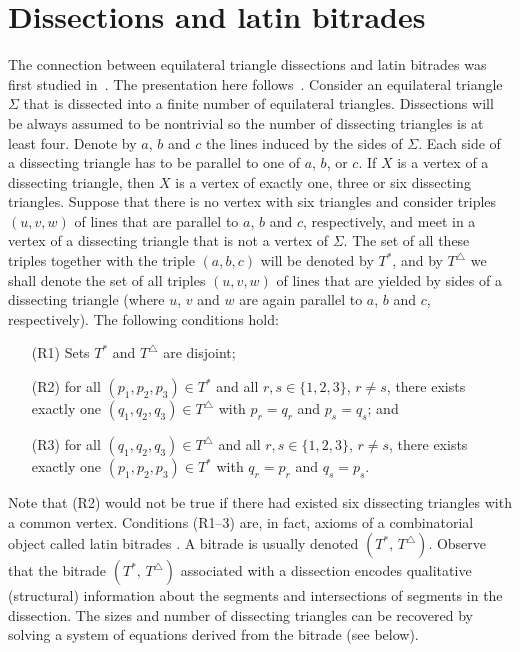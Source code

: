 \documentclass[12pt,amstags,fleqn]{article}
\theoremstyle{plain}
\theoremstyle{definition}
\def\ll{{\textstyle \ast}}
\def\rr{{\scriptscriptstyle \triangle}}
\newcommand{\opa}{\ll}
\newcommand{\opb}{\rr}
\begin{document}
\section{Dissections and latin bitrades}

The connection between equilateral triangle dissections and latin
bitrades was first studied in~\cite{aleshamming}. The presentation here
follows~\cite{alesdissections}.  
Consider an equilateral triangle $\Sigma$ that is dissected
into a finite number of equilateral triangles. 
Dissections will be always assumed to be nontrivial so the
number of dissecting triangles is at least four. 
Denote by $a$, $b$ and $c$
the lines induced by the sides of $\Sigma$.
Each side of a dissecting triangle has to be parallel
to one of $a$, $b$, or $c$. If $X$ is a vertex
of a dissecting triangle, then $X$ is a vertex of exactly one,
three or six dissecting triangles. Suppose that there is
no vertex with six triangles and consider triples 
$(u,v,w)$ of lines that are parallel to $a$, $b$ and $c$, respectively,
and meet in  a vertex of a dissecting triangle that is not a vertex
of $\Sigma$. The set of all these triples together with the triple
$(a,b,c)$ will be denoted by $T^\ll$, and by $T^\rr$ we shall
denote the set of all triples $(u,v,w)$ of lines that are yielded 
by sides of a dissecting triangle (where $u$, $v$ and $w$ are again parallel to
$a$, $b$ and $c$, respectively). The following conditions
hold:
\begin{enumerate}
\item[(R1)] Sets $T^\ll$ and $T^\rr$ are disjoint;
\item[(R2)] for all $(p_1,p_2,p_3)\in T^\ll$ and 
all $r,s \in \{1,2,3\}$, $r \ne s$, there exists exactly one
$(q_1,q_2,q_3) \in T^\rr$ with $p_r = q_r$ and $p_s = q_s$; and
\item[(R3)] for all $(q_1,q_2,q_3)\in T^\rr$ and
all $r,s \in \{1,2,3\}$, $r \ne s$, there exists exactly one
$(p_1,p_2,p_3) \in T^\ll$ with $q_r = p_r$ and $q_s = p_s$.
\end{enumerate}

Note that (R2) would not be true if there had existed six dissecting
triangles with a common vertex. Conditions (R1--3) are, in fact, axioms
of a combinatorial object called latin bitrades
\cite[p.~148]{wanlesshandbook}. A bitrade is usually denoted
$(T^{\opa},\, T^{\opb})$. Observe that the bitrade $(T^{\opa},\,
T^{\opb})$ associated with a dissection encodes
qualitative
(structural) information about the segments and intersections of
segments in the dissection. The sizes and number of dissecting triangles
can be recovered by solving a system of equations derived from 
the bitrade (see below).
\end{document}
